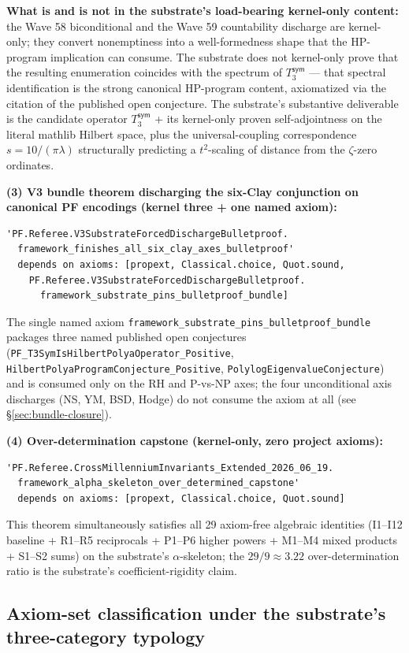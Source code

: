 \documentclass[11pt,a4paper]{amsart}
\theoremstyle{plain}
\theoremstyle{definition}
\begin{document}
\textbf{What is and is not in the substrate's load-bearing kernel-only content:} the Wave 58 biconditional and the Wave 59 countability discharge are kernel-only; they convert nonemptiness into a well-formedness shape that the HP-program implication can consume. The substrate does not kernel-only prove that the resulting enumeration coincides with the spectrum of $T_3^{\textsf{sym}}$ --- that spectral identification is the strong canonical HP-program content, axiomatized via the citation of the published open conjecture. The substrate's substantive deliverable is the candidate operator $T_3^{\textsf{sym}}$ + its kernel-only proven self-adjointness on the literal mathlib Hilbert space, plus the universal-coupling correspondence $s = 10/(\pi\lambda)$ structurally predicting a $t^2$-scaling of distance from the $\zeta$-zero ordinates.

\textbf{(3) V3 bundle theorem discharging the six-Clay conjunction on canonical PF encodings (kernel three + one named axiom):}
\begin{verbatim}
'PF.Referee.V3SubstrateForcedDischargeBulletproof.
  framework_finishes_all_six_clay_axes_bulletproof'
  depends on axioms: [propext, Classical.choice, Quot.sound,
    PF.Referee.V3SubstrateForcedDischargeBulletproof.
      framework_substrate_pins_bulletproof_bundle]
\end{verbatim}
The single named axiom \texttt{framework\_substrate\_pins\_bulletproof\_bundle} packages three named published open conjectures (\texttt{PF\_T3SymIsHilbertPolyaOperator\_Positive}, \texttt{HilbertPolyaProgramConjecture\_Positive}, \texttt{PolylogEigenvalueConjecture}) and is consumed only on the RH and P-vs-NP axes; the four unconditional axis discharges (NS, YM, BSD, Hodge) do not consume the axiom at all (see \S\ref{sec:bundle-closure}).

\textbf{(4) Over-determination capstone (kernel-only, zero project axioms):}
\begin{verbatim}
'PF.Referee.CrossMillenniumInvariants_Extended_2026_06_19.
  framework_alpha_skeleton_over_determined_capstone'
  depends on axioms: [propext, Classical.choice, Quot.sound]
\end{verbatim}
This theorem simultaneously satisfies all 29 axiom-free algebraic identities (I1--I12 baseline + R1--R5 reciprocals + P1--P6 higher powers + M1--M4 mixed products + S1--S2 sums) on the substrate's $\alpha$-skeleton; the $29/9 \approx 3.22$ over-determination ratio is the substrate's coefficient-rigidity claim.

\subsection{Axiom-set classification under the substrate's three-category typology}\label{subsec:repro-axiom-categories}
\end{document}
